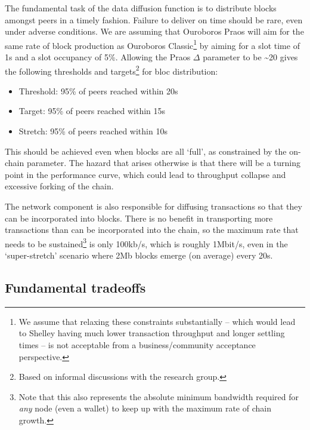 \documentclass[11pt,a4paper]{article}
\begin{document}
The fundamental task of the data diffusion function is to distribute
blocks amongst peers in a timely fashion. Failure to deliver on time
should be rare, even under adverse conditions. We are assuming that
Ouroboros Praos will aim for the same rate of block production as
Ouroboros Classic\footnote{We assume that relaxing these constraints
substantially -- which would lead to Shelley having much lower
transaction throughput and longer settling times -- is not acceptable
from a business/community acceptance perspective.} by aiming for a
slot time of 1s and a slot occupancy of 5\%. Allowing the Praos $\Delta$
parameter to be \textasciitilde{}20 gives the following thresholds and
targets\footnote{Based on informal discussions with the research group.}
for bloc distribution:


\begin{itemize}
\item
  Threshold: 95\% of peers reached within 20s
\item
  Target: 95\% of peers reached within 15s
\item
  Stretch: 95\% of peers reached within 10s
\end{itemize}

This should be achieved even when blocks are all `full', as constrained
by the on-chain parameter. The hazard that arises otherwise is that
there will be a turning point in the performance curve, which could lead
to throughput collapse and excessive forking of the chain.

The network component is also responsible for diffusing transactions so
that they can be incorporated into blocks. There is no benefit in
transporting more transactions than can be incorporated into the chain,
so the maximum rate that needs to be sustained\footnote{Note that this
  also represents the absolute minimum bandwidth required for \emph{any}
  node (even a wallet) to keep up with the maximum rate of chain growth.}
is only 100kb/s, which is roughly 1Mbit/s, even in the `super-stretch'
scenario where 2Mb blocks emerge (on average) every 20s.

\subsection{Fundamental tradeoffs}
\label{fundamental-tradeoffs}
\end{document}
